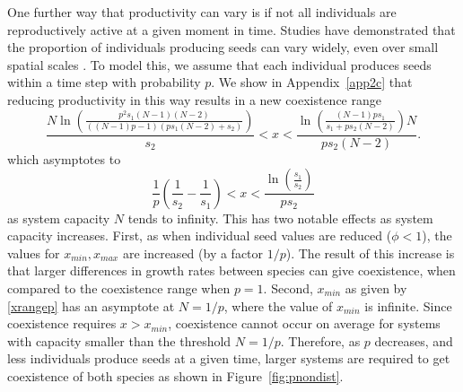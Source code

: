 One further way that productivity can vary is if not all individuals are reproductively active at a given moment in time. Studies have demonstrated that the proportion of individuals producing seeds can vary widely, even over small spatial scales \citep{kettle2011seeing}. To model this, we assume that each individual produces seeds within a time step with probability $p$. We show in Appendix~\ref{app2c} that reducing productivity in this way results in a new coexistence range
\begin{equation}
\label{xrangep}
\frac{N\ln \left( \frac{p^2 s_1(N-1)(N-2)}{((N-1)p-1)(ps_1(N-2)+s_2)} \right)}{s_2}<x<\frac{\ln \left( \frac{(N-1)ps_1}{s_1+ps_2(N-2)}\right) N}{ps_2(N-2)}.
\end{equation}
which asymptotes to
\begin{equation}
\frac{1}{p}\left(\frac{1}{s_2}-\frac{1}{s_1}\right)<x<\frac{\ln\left(\frac{s_1}{s_2}\right)}{ps_2}
\end{equation}
as system capacity $N$ tends to infinity. This has two notable effects as system capacity increases. First, as when individual seed values are reduced ($\phi<1$), the values for $x_{min},x_{max}$ are increased (by a factor $1/p$). The result of this increase is that larger differences in growth rates between species can give coexistence, when compared to the coexistence range when $p=1$. Second, $x_{min}$ as given by \eqref{xrangep} has an asymptote at $N=1/p$, where the value of $x_{min}$ is infinite. Since coexistence requires $x>x_{min}$, coexistence cannot occur on average for systems with capacity smaller than the threshold $N=1/p$. Therefore, as $p$ decreases, and less individuals produce seeds at a given time, larger systems are required to get coexistence of both species as shown in Figure~\ref{fig:pnondist}.  
